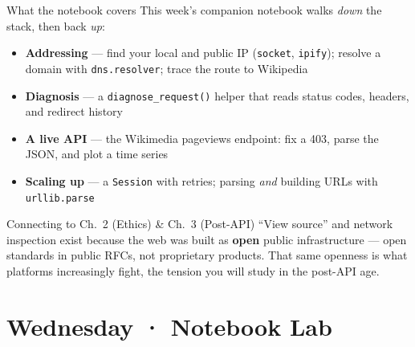 \documentclass[9pt,aspectratio=169]{beamer}
\begin{document}
\begin{frame}{What the notebook covers}
    This week's companion notebook walks \emph{down} the stack, then back \emph{up}:
    \begin{itemize}
        \item \textbf{Addressing} --- find your local and public IP (\texttt{socket}, \texttt{ipify}); resolve a domain with \texttt{dns.resolver}; trace the route to Wikipedia
        \item \textbf{Diagnosis} --- a \texttt{diagnose\_request()} helper that reads status codes, headers, and redirect history
        \item \textbf{A live API} --- the Wikimedia pageviews endpoint: fix a 403, parse the JSON, and plot a time series
        \item \textbf{Scaling up} --- a \texttt{Session} with retries; parsing \emph{and} building URLs with \texttt{urllib.parse}
    \end{itemize}

    \vspace{0.6em}

    \begin{alertblock}{Connecting to Ch.~2 (Ethics) \& Ch.~3 (Post-API)}
        ``View source'' and network inspection exist because the web was built as \textbf{open} public infrastructure --- open standards in public RFCs, not proprietary products. That same openness is what platforms increasingly fight, the tension you will study in the post-API age.
    \end{alertblock}
\end{frame}

\section{Wednesday · Notebook Lab}
\end{document}
